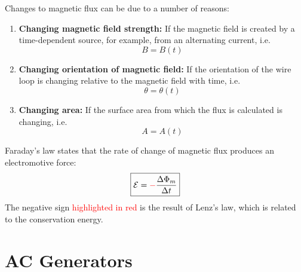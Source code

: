 Changes to magnetic flux can be due to a number of reasons:
\begin{enumerate}
\item\textbf{Changing magnetic field strength:} If the magnetic field is
  created by a time-dependent source, for example, from an alternating
  current, i.e.
  \begin{displaymath}
    B=B(t)
  \end{displaymath}
\item\textbf{Changing orientation of magnetic field:} If the orientation of
  the wire loop is changing relative to the magnetic field with time, i.e.
  \begin{displaymath}
    \theta=\theta(t)
  \end{displaymath}
\item\textbf{Changing area:} If the surface area from which the flux is
  calculated is changing, i.e.
  \begin{displaymath}
    A=A(t)
  \end{displaymath}
\end{enumerate}


Faraday's law states that the rate of change of magnetic flux produces an
electromotive force:
\begin{equation}
  \boxed{
    \mathcal E={\color{red}-}\frac{\Delta\Phi_m}{\Delta t}
  }
\end{equation}
The negative sign {\textcolor{red}{highlighted in red}} is the result of Lenz's
law, which is related to the conservation energy.



\section{AC Generators}

